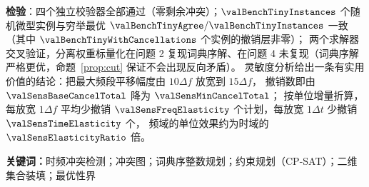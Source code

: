 \textbf{检验}：四个独立校验器全部通过（零剩余冲突）；$\valBenchTinyInstances$ 个随机微型实例与穷举最优
$\valBenchTinyAgree/\valBenchTinyInstances$ 一致（其中 $\valBenchTinyWithCancellations$ 个实例的撤销层非零）；
两个求解器交叉验证，分离权重标量化在问题 2 复现词典序解、在问题 4 未复现（词典序解严格更优，命题~\ref{prop:cut} 保证不会出现反向矛盾）。
灵敏度分析给出一条有实用价值的结论：把最大频段平移幅度由 $10\Delta f$ 放宽到 $15\Delta f$，
撤销数即由 $\valSensBaseCancelTotal$ 降为 $\valSensMinCancelTotal$；
按单位增量折算，每放宽 $1\Delta f$ 平均少撤销 $\valSensFreqElasticity$ 个计划，每放宽 $1\Delta t$ 少撤销 $\valSensTimeElasticity$ 个，
频域的单位效果约为时域的 $\valSensElasticityRatio$ 倍。

\par\vspace{0.5em}
\noindent\textbf{关键词：}时频冲突检测；冲突图；词典序整数规划；约束规划（CP-SAT）；二维集合装填；最优性界
